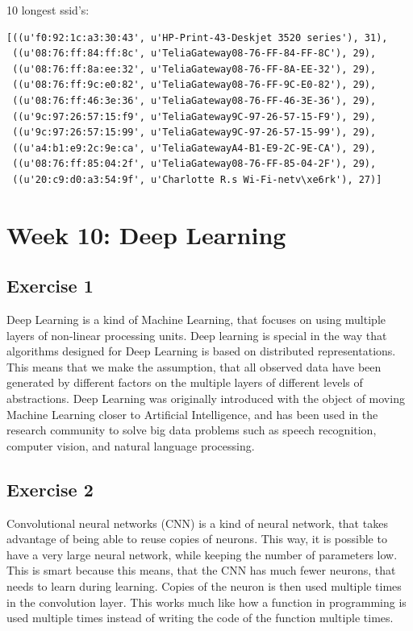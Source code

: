 \documentclass{article}
\begin{document}
10 longest ssid's:

\begin{lstlisting}
[((u'f0:92:1c:a3:30:43', u'HP-Print-43-Deskjet 3520 series'), 31),
 ((u'08:76:ff:84:ff:8c', u'TeliaGateway08-76-FF-84-FF-8C'), 29),
 ((u'08:76:ff:8a:ee:32', u'TeliaGateway08-76-FF-8A-EE-32'), 29),
 ((u'08:76:ff:9c:e0:82', u'TeliaGateway08-76-FF-9C-E0-82'), 29),
 ((u'08:76:ff:46:3e:36', u'TeliaGateway08-76-FF-46-3E-36'), 29),
 ((u'9c:97:26:57:15:f9', u'TeliaGateway9C-97-26-57-15-F9'), 29),
 ((u'9c:97:26:57:15:99', u'TeliaGateway9C-97-26-57-15-99'), 29),
 ((u'a4:b1:e9:2c:9e:ca', u'TeliaGatewayA4-B1-E9-2C-9E-CA'), 29),
 ((u'08:76:ff:85:04:2f', u'TeliaGateway08-76-FF-85-04-2F'), 29),
 ((u'20:c9:d0:a3:54:9f', u'Charlotte R.s Wi-Fi-netv\xe6rk'), 27)]
\end{lstlisting}

\section{Week 10: Deep Learning}

\subsection{Exercise 1}

Deep Learning is a kind of Machine Learning, that focuses on using multiple layers of non-linear processing units. Deep learning is special in the way that algorithms designed for Deep Learning is based on distributed representations. This means that we make the assumption, that all observed data have been generated by different factors on the multiple layers of different levels of abstractions. Deep Learning was originally introduced with the object of moving Machine Learning closer to Artificial Intelligence, and has been used in the research community to solve big data problems such as speech recognition, computer vision, and natural language processing.


\subsection{Exercise 2}

Convolutional neural networks (CNN) is a kind of neural network, that takes advantage of being able to reuse copies of neurons. This way, it is possible to have a very large neural network, while keeping the number of parameters low. This is smart because this means, that the CNN has much fewer neurons, that needs to learn during learning. Copies of the neuron is then used multiple times in the convolution layer. This works much like how a function in programming is used multiple times instead of writing the code of the function multiple times.
\end{document}
